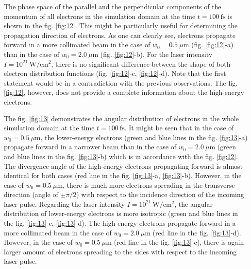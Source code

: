 The phase space of the parallel and the perpendicular components of the momentum of all electrons in the simulation domain at the time $ t = 100 \ \mathrm{fs} $ is shown in the fig. \ref{fig:12}. This might be particularly useful for determining the propagation direction of electrons. As one can clearly see, electrons propagate forward in a more collimated beam in the case of $ w_0 = 0.5 \ \mu\mathrm{m} $ (fig. \ref{fig:12}-a) than in the case of $ w_0 = 2.0 \ \mu\mathrm{m} $ (fig. \ref{fig:12}-b). For the laser intensity $ I = 10^{21} \ \mathrm{W/cm^2} $, there is no significant difference between the shape of both electron distribution functions (fig. \ref{fig:12}-c, \ref{fig:12}-d). Note that the first statement would be in a contradiction with the previous observations. The fig. \ref{fig:12}, however, does not provide a complete information about the high-energy electrons.

The fig. \ref{fig:13} demonstrates the angular distribution of electrons in the whole simulation domain at the time $ t = 100 \ \mathrm{fs} $. It might be seen that in the case of $ w_0 = 0.5 \ \mu\mathrm{m} $, the lower-energy electrons (green and blue lines in the fig. \ref{fig:13}-a) propagate forward in a narrower beam than in the case of $ w_0 = 2.0 \ \mu\mathrm{m} $ (green and blue lines in the fig. \ref{fig:13}-b) which is in accordance with the fig. \ref{fig:12}. The divergence angle of the high-energy electrons propagating forward is almost identical for both cases (red line in the fig. \ref{fig:13}-a, \ref{fig:13}-b). However, in the case of $ w_0 = 0.5 \ \mu\mathrm{m} $, there is much more electrons spreading in the transverse direction (angle of $ \pm \pi/2 $) with respect to the incidence direction of the incoming laser pulse. Regarding the laser intensity $ I = 10^{21} \ \mathrm{W/cm^2} $, the angular distribution of lower-energy electrons is more isotropic (green and blue lines in the fig. \ref{fig:13}-c, \ref{fig:13}-d). The high-energy electrons propagate forward in a more collimated beam in the case of $ w_0 = 2.0 \ \mu\mathrm{m} $ (red line in the fig. \ref{fig:13}-d). However, in the case of $ w_0 = 0.5 \ \mu\mathrm{m} $ (red line in the fig. \ref{fig:13}-c), there is again larger amount of electrons spreading to the sides with respect to the incoming laser pulse.


